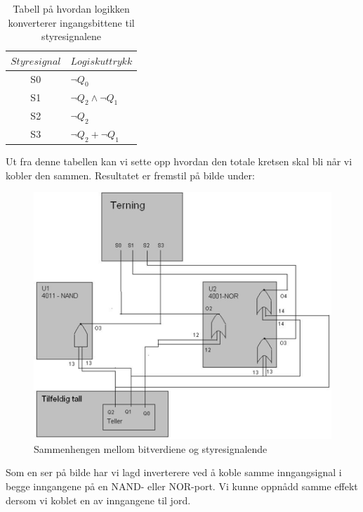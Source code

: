 \documentclass[12pt,norsk,a4paper]{article}
\begin{document}
    \begin{table}[H] 
    \begin{center}
        \begin{tabular}{ | c | l |} 
        \hline
        $Styresignal$  & $Logisk uttrykk$ \\ \hline 
        S0 & $\neg Q_0$\\ \hline
        S1 & $\neg Q_2 \wedge \neg Q_1$\\ \hline
        S2 & $\neg Q_2$\\ \hline
        S3 & $\neg Q_2 + \neg Q_1$\\ \hline
        \hline
        \end{tabular}
        \end{center}
        \caption{Tabell på hvordan logikken konverterer ingangsbittene til styresignalene}

\end{table}

    Ut fra denne tabellen kan vi sette opp hvordan den totale kretsen skal bli når vi kobler den sammen. Resultatet er fremstil på bilde under: 

    \begin{figure}[H]
    \includegraphics[scale=0.75]{Krestkortet.png}
    \caption{Sammenhengen mellom bitverdiene og styresignalende}
    \label{fig:krestkortet}
    \end{figure}

    Som en ser på bilde har vi lagd inverterere ved å koble samme inngangsignal i begge inngangene på en NAND- eller NOR-port. Vi kunne oppnådd samme effekt dersom vi koblet en av inngangene til jord.    
\end{document}
